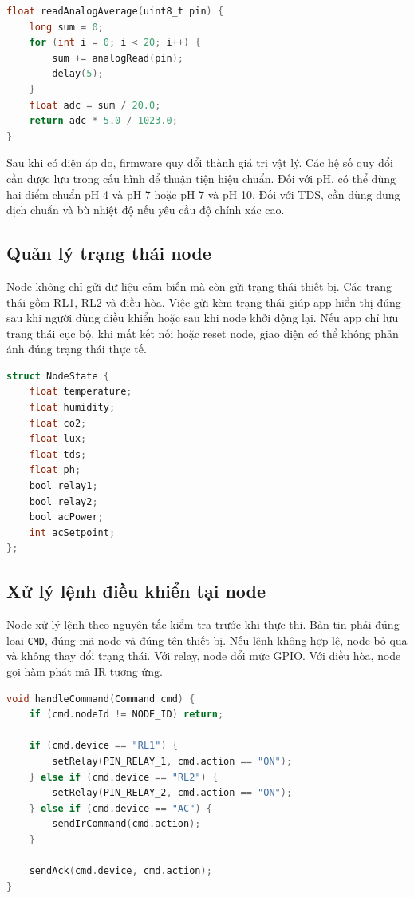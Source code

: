 \begin{lstlisting}[language=C,caption={Mã giả đọc và lọc cảm biến analog}]
float readAnalogAverage(uint8_t pin) {
    long sum = 0;
    for (int i = 0; i < 20; i++) {
        sum += analogRead(pin);
        delay(5);
    }
    float adc = sum / 20.0;
    return adc * 5.0 / 1023.0;
}
\end{lstlisting}

Sau khi có điện áp đo, firmware quy đổi thành giá trị vật lý. Các hệ số quy đổi cần được lưu trong cấu hình để thuận tiện hiệu chuẩn. Đối với pH, có thể dùng hai điểm chuẩn pH 4 và pH 7 hoặc pH 7 và pH 10. Đối với TDS, cần dùng dung dịch chuẩn và bù nhiệt độ nếu yêu cầu độ chính xác cao.

\subsection{Quản lý trạng thái node}
Node không chỉ gửi dữ liệu cảm biến mà còn gửi trạng thái thiết bị. Các trạng thái gồm RL1, RL2 và điều hòa. Việc gửi kèm trạng thái giúp app hiển thị đúng sau khi người dùng điều khiển hoặc sau khi node khởi động lại. Nếu app chỉ lưu trạng thái cục bộ, khi mất kết nối hoặc reset node, giao diện có thể không phản ánh đúng trạng thái thực tế.

\begin{lstlisting}[language=C,caption={Cấu trúc dữ liệu trạng thái node}]
struct NodeState {
    float temperature;
    float humidity;
    float co2;
    float lux;
    float tds;
    float ph;
    bool relay1;
    bool relay2;
    bool acPower;
    int acSetpoint;
};
\end{lstlisting}

\subsection{Xử lý lệnh điều khiển tại node}
Node xử lý lệnh theo nguyên tắc kiểm tra trước khi thực thi. Bản tin phải đúng loại \texttt{CMD}, đúng mã node và đúng tên thiết bị. Nếu lệnh không hợp lệ, node bỏ qua và không thay đổi trạng thái. Với relay, node đổi mức GPIO. Với điều hòa, node gọi hàm phát mã IR tương ứng.

\begin{lstlisting}[language=C,caption={Mã giả xử lý lệnh actuator}]
void handleCommand(Command cmd) {
    if (cmd.nodeId != NODE_ID) return;

    if (cmd.device == "RL1") {
        setRelay(PIN_RELAY_1, cmd.action == "ON");
    } else if (cmd.device == "RL2") {
        setRelay(PIN_RELAY_2, cmd.action == "ON");
    } else if (cmd.device == "AC") {
        sendIrCommand(cmd.action);
    }

    sendAck(cmd.device, cmd.action);
}
\end{lstlisting}
